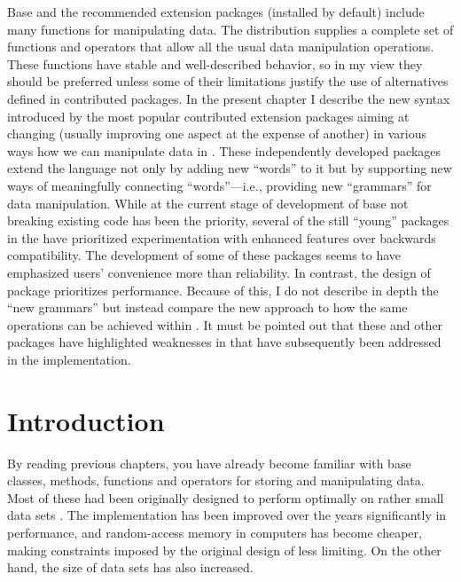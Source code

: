 \documentclass[krantz2]{krantz}\usepackage{knitr}
\begin{document}
Base \Rlang and the recommended extension packages (installed by default) include many functions for manipulating data. The \Rlang distribution supplies a complete set of functions and operators that allow all the usual data manipulation operations. These functions have stable and well-described behavior, so in my view they should be preferred unless some of their limitations justify the use of alternatives defined in contributed packages. In the present chapter I describe the new syntax introduced by the most popular contributed \Rlang extension packages aiming at changing (usually improving one aspect at the expense of another) in various ways how we can manipulate data in \Rlang. These independently developed packages extend the \Rlang language not only by adding new ``words'' to it but by supporting new ways of meaningfully connecting ``words''---i.e., providing new ``grammars'' for data manipulation. While at the current stage of development of base \Rlang not breaking existing code has been the priority, several of the still ``young'' packages in the  have prioritized experimentation with enhanced features over backwards compatibility. The development of some of these packages seems to have emphasized users' convenience more than reliability. In contrast, the design of package  prioritizes performance. Because of this, I do not describe in depth the ``new grammars'' but instead compare the new approach to how the same operations can be achieved within \Rlang. It must be pointed out that these and other packages have highlighted weaknesses in \Rlang that have subsequently been addressed in the \Rpgrm implementation.

\section{Introduction}

By reading previous chapters, you have already become familiar with base \Rlang classes, methods, functions and operators for storing and manipulating data. Most of these had been originally designed to perform optimally on rather small data sets \autocite[see][]{Matloff2011}. The \Rlang implementation has been improved over the years significantly in performance, and random-access memory in computers has become cheaper, making constraints imposed by the original design of \Rpgrm less limiting. On the other hand, the size of data sets has also increased.
\end{document}
